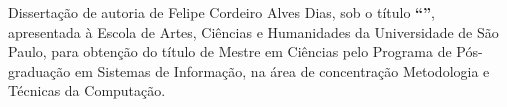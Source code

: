 \documentclass[
	12pt,				%
	oneside,			%
	a4paper,			%
	english,			%
	brazil				%
	]{abntex2ppgsi}
\begin{document}

\begin{folhadeaprovacao}
%
%
%
%
%
\noindent Dissertação de autoria de Felipe Cordeiro Alves Dias, sob o título \textbf{``\imprimirtitulo''}, apresentada à Escola de Artes, Ciências e Humanidades da Universidade de São Paulo, para obtenção do título de Mestre em Ciências pelo Programa de Pós-graduação em Sistemas de Informação, na área de concentração Metodologia e Técnicas da Computação. %

\vspace*{3cm}


\end{folhadeaprovacao}
\end{document}
